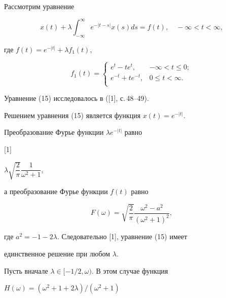 \medskip








\begin{exam} Рассмотрим уравнение


\begin{equation}


x(t)+\lambda\int_{-\infty}^\infty e^{-|t-s|}


x(s) ds=f(t), \quad -\infty <t<\infty,


\end{equation}


где $ f(t) = e^{-|t|}+\lambda f_1(t)$,


$$


f_1(t)=


\begin{cases}


e^t-te^t, & -\infty <t\le 0;\\


e^{-t}+te^{-t}, & 0\le t<\infty.\\


\end{cases}


$$





Уравнение (15) исследовалось в ([1], с.\,48--49).


Решением уравнения (15) является функция $ x(t)=e^{-|t|}$.


Преобразование Фурье функции $\lambda e^{-|t|}$ равно


[1]


$\lambda\sqrt{\dfrac{2}{\pi}}\dfrac{1}


{\omega^2+1}$,


а преобразование Фурье функции $ f(t) $ равно


$$


F(\omega)=\sqrt{\frac{2}{\pi}}\frac{\omega^2-a^2}{(\omega^2+


1)^2},


$$


где $ a^2=-1-2\lambda$. Следовательно [1], уравнение (15) имеет


единственное решение при любом $\lambda$.





Пусть вначале $\lambda\in [-1/2,\omega)$. В этом случае функция


$ H(\omega)=(\omega^2+1+2\lambda)/(\omega^2+1) $



\end{exam}
